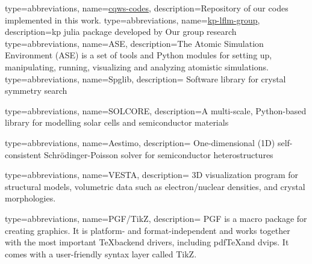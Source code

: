 
{ type=abbreviations,
    name={\href{https://github.com/lflmgroup/cqws-codes.git}{cqws-codes}},
    description={Repository of our codes implemented in this work. }
    \cite{cqws-codes}
}
{ type=abbreviations,
    name={\href{https://github.com/lflmgroup/kp-lflm-group.git}{kp-lflm-group}},
    description={\gls{kp} julia\cite{Julia-2017} package developed by Our group research}
    \cite{kp-lflm-group}
}
{ type=abbreviations,
    name={ASE},
    description={The Atomic Simulation Environment (ASE) is a set of tools and Python modules for setting up, 
    manipulating, running, visualizing and analyzing atomistic simulations. \cite{ask2017ase}}
}
{ 
    type=abbreviations,
    name={Spglib},
    description=
    {
    Software library for crystal symmetry search\cite{togo2018textttspglib}
    }
}

{ type=abbreviations,
    name={SOLCORE},
    description={A multi-scale, Python-based library for modelling solar cells and semiconductor materials
     \cite{alonso2018solcore}}
}

{ type=abbreviations,
    name={Aestimo},
    description=
    {
    One-dimensional (1D) self-consistent Schrödinger-Poisson solver for 
    semiconductor heterostructures
    \cite{hebal2021general}
    }
}

{ type=abbreviations,
    name={VESTA},
    description=
    {
    3D visualization program for structural models, volumetric data such as electron/nuclear 
    densities, and crystal morphologies. 
    \cite{momma2011vesta}
    }
}

{ 
    type=abbreviations,
    name={PGF/TikZ},
    description=
    {
    PGF is a macro package for creating graphics. It is platform- and format-independent and works together 
    with the most important \TeX backend drivers, including pdf\TeX  and dvips. It comes with a user-friendly 
    syntax layer called TikZ. 
    \cite{pgftikz}
    }
}



